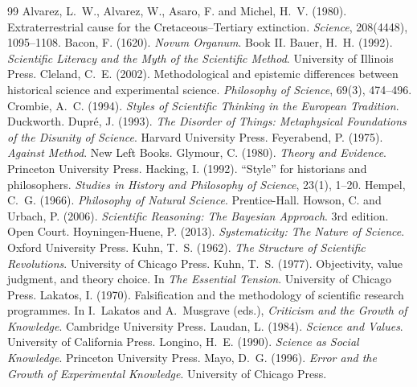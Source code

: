 \documentclass{situationist-preprint}
\begin{document}
\begin{thebibliography}{99}\small
{} Alvarez, L.~W., Alvarez, W., Asaro, F. and Michel, H.~V. (1980). Extraterrestrial cause for the Cretaceous--Tertiary extinction. \emph{Science}, 208(4448), 1095--1108.
 Bacon, F. (1620). \emph{Novum Organum}. Book II.
 Bauer, H.~H. (1992). \emph{Scientific Literacy and the Myth of the Scientific Method}. University of Illinois Press.
 Cleland, C.~E. (2002). Methodological and epistemic differences between historical science and experimental science. \emph{Philosophy of Science}, 69(3), 474--496.
 Crombie, A.~C. (1994). \emph{Styles of Scientific Thinking in the European Tradition}. Duckworth.
 Dupr\'e, J. (1993). \emph{The Disorder of Things: Metaphysical Foundations of the Disunity of Science}. Harvard University Press.
 Feyerabend, P. (1975). \emph{Against Method}. New Left Books.
 Glymour, C. (1980). \emph{Theory and Evidence}. Princeton University Press.
 Hacking, I. (1992). \enquote{Style} for historians and philosophers. \emph{Studies in History and Philosophy of Science}, 23(1), 1--20.
 Hempel, C.~G. (1966). \emph{Philosophy of Natural Science}. Prentice-Hall.
 Howson, C. and Urbach, P. (2006). \emph{Scientific Reasoning: The Bayesian Approach}. 3rd edition. Open Court.
 Hoyningen-Huene, P. (2013). \emph{Systematicity: The Nature of Science}. Oxford University Press.
 Kuhn, T.~S. (1962). \emph{The Structure of Scientific Revolutions}. University of Chicago Press.
 Kuhn, T.~S. (1977). Objectivity, value judgment, and theory choice. In \emph{The Essential Tension}. University of Chicago Press.
 Lakatos, I. (1970). Falsification and the methodology of scientific research programmes. In I.~Lakatos and A.~Musgrave (eds.), \emph{Criticism and the Growth of Knowledge}. Cambridge University Press.
 Laudan, L. (1984). \emph{Science and Values}. University of California Press.
 Longino, H.~E. (1990). \emph{Science as Social Knowledge}. Princeton University Press.
 Mayo, D.~G. (1996). \emph{Error and the Growth of Experimental Knowledge}. University of Chicago Press.

\end{thebibliography}
\end{document}
